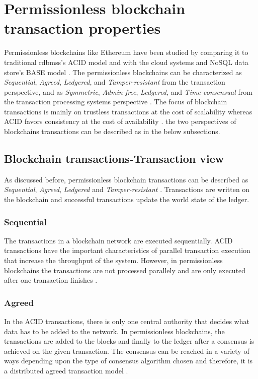 \documentclass[
  a4paper,  %
  twoside,  %
  bibliography=totoc,
  headsepline,
  cleardoublepage=empty,
  parskip=half,
  draft=false
]{scrbook}
\begin{document}
\section{Permissionless blockchain transaction properties}
Permissionless blockchains like Ethereum have been studied by comparing it to traditional \glspl{rdbms}'s ACID model and with the cloud systems and NoSQL data store's BASE model \cite{Salt}. The permissionless blockchains can be characterized as \textit{Sequential}, \textit{Agreed}, \textit{Ledgered}, and \textit{Tamper-resistant} from the transaction perspective, and as \textit{Symmetric}, \textit{Admin-free}, \textit{Ledgered}, and \textit{Time-consensual} from the transaction processing systems perspective \cite{Salt}. The focus of blockchain transactions is mainly on trustless transactions at the cost of scalability whereas ACID favors consistency at the cost of availability \cite{Tai}. the two perspectives of blockchains transactions can be described as in the below subsections. 

\subsection{Blockchain transactions-Transaction view}
As discussed before, permissionless blockchain transactions can be described as \textit{Sequential}, \textit{Agreed}, \textit{Ledgered} and \textit{Tamper-resistant} \cite{Salt}. Transactions are written on the blockchain and successful transactions update the world state of the ledger.

\subsubsection{Sequential}
The transactions in a blockchain network are executed sequentially. ACID transactions have the important characteristics of parallel transaction execution that increase the throughput of the system. However, in permissionless blockchains the transactions are not processed parallely and are only executed after one transaction finishes \cite{Salt}.

\subsubsection{Agreed}
In the ACID transactions, there is only one central authority that decides what data has to be added to the network. In permissionless blockchains, the transactions are added to the blocks and finally to the ledger after a consensus is achieved on the given transaction. The consensus can be reached in a variety of ways depending upon the type of consensus algorithm chosen and therefore, it is a distributed agreed transaction model \cite{Salt}.
\end{document}
